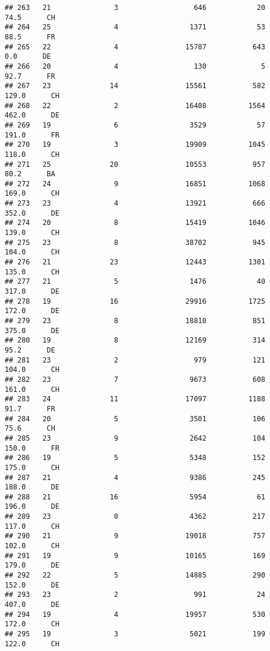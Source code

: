 \documentclass[
]{article}
\begin{document}
\begin{verbatim}
## 263   21               3                  646            20     74.5      CH
## 264   25               4                 1371            53     88.5      FR
## 265   22               4                15787           643      0.0      DE
## 266   20               4                  130             5     92.7      FR
## 267   23              14                15561           582    129.0      CH
## 268   22               2                16408          1564    462.0      DE
## 269   19               6                 3529            57    191.0      FR
## 270   19               3                19909          1045    118.0      CH
## 271   25              20                10553           957     80.2      BA
## 272   24               9                16851          1068    169.0      CH
## 273   23               4                13921           666    352.0      DE
## 274   20               8                15419          1046    139.0      CH
## 275   23               8                38702           945    104.0      CH
## 276   21              23                12443          1301    135.0      CH
## 277   21               5                 1476            40    317.0      DE
## 278   19              16                29916          1725    172.0      DE
## 279   23               8                18810           851    375.0      DE
## 280   19               8                12169           314     95.2      DE
## 281   23               2                  979           121    104.0      CH
## 282   23               7                 9673           608    161.0      CH
## 283   24              11                17097          1188     91.7      FR
## 284   20               5                 3501           106     75.6      CH
## 285   23               9                 2642           104    150.0      FR
## 286   19               5                 5348           152    175.0      CH
## 287   21               4                 9386           245    188.0      DE
## 288   21              16                 5954            61    196.0      DE
## 289   23               0                 4362           217    117.0      CH
## 290   21               9                19018           757    102.0      CH
## 291   19               9                10165           169    179.0      DE
## 292   22               5                14885           290    152.0      DE
## 293   23               2                  991            24    407.0      DE
## 294   19               4                19957           530    172.0      CH
## 295   19               3                 5021           199    122.0      CH

\end{verbatim}
\end{document}
